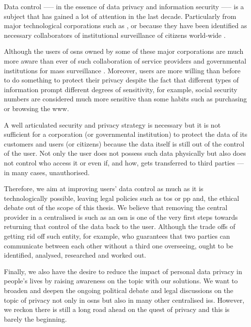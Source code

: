 \documentclass[showtrims,oldfontcommands]{kthesis}
\begin{document}
Data control —-- in the essence of data privacy and information security —-- is a 
subject that has gained a lot of attention in the last decade. Particularly from 
major technological corporations such as \Google, \Apple or \Facebook because they 
have been identified as necessary collaborators of institutional surveillance of 
citizens world-wide \cite{Lyon14}.

Although the users of \acp{osn} owned by some of these major corporations are much more 
aware than ever of such collaboration of service providers and governmental institutions 
for mass surveillance \cite{Madden14}. Moreover, users are more willing than before 
to do something to protect their privacy despite the fact that different types of 
information prompt different degrees of sensitivity, for example, social security 
numbers are considered much more sensitive than some habits such as purchasing or 
browsing the \ac{www}.

A well articulated security and privacy strategy is necessary but it is not sufficient 
for a corporation (or governmental institution) to protect the data of its customers 
and users (or citizens) because the data itself is still out of the control of the 
user. Not only the user does not possess such data physically but also does not 
control who access it or even if, and how, gets transferred to third parties --- 
in many cases, unauthorised.

Therefore, we aim at improving users' data control as much as it is technologically 
possible, leaving legal policies such as \ac{tos} or \ac{pp} and, the ethical debate 
out of the scope of this thesis. We believe that removing the central provider in 
a centralised \ac{is} such as an \ac{osn} is one of the very first steps towards 
returning that control of the data back to the user. Although the trade offs of 
getting rid off such entity, for example, who guarantees that two parties can communicate 
between each other without a third one overseeing, ought to be identified, analysed, 
researched and worked out.

Finally, we also have the desire to reduce the impact of personal data privacy in 
people's lives by raising awareness on the topic with our solutions. We want to 
broaden and deepen the ongoing political debate and legal discussions on the topic 
of privacy not only in \acp{osn} but also in many other centralised \acp{is}. However, 
we reckon there is still a long road ahead on the quest of privacy and this is barely 
the beginning.
\end{document}
